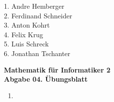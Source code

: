 \documentclass[a4paper,abstract,german]{scrreprt}
\begin{document}
\noindent
{\begin{flushright}
%
%	
1. Andre Hemberger \\
2. Ferdinand Schneider \\
3. Anton Kohrt \\
4. Felix Krug \\
5. Luis Schreck \\
6. Jonathan Tschanter
\end{flushright}}
\begin{center}
	{\textbf  {Mathematik für Informatiker 2}} \\
	{\textbf {Abgabe 04. Übungsblatt}}
\end{center}\vspace{0.3cm}

%
%
\begin{enumerate}

	\item[\textbf {H1}]
	
\end{enumerate}
\end{document}

